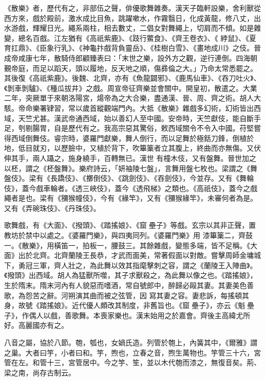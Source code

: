 \begin{pinyinscope}
 《散樂》者，歷代有之，非部伍之聲，俳優歌舞雜奏。漢天子臨軒設樂，舍利獸從西方來，戲於殿前，激水成比目魚，跳躍嗽水，作霧翳日，化成黃龍，修八丈，出水游戲，輝耀日光。繩系兩柱，相去數丈，二倡女對舞繩上，切肩而不傾。如是雜變，總名百戲。江左猶有《高祇紫鹿》、《跂行鱉食》、《齊王卷衣》、《
 綍鼠》、《夏育扛鼎》、《臣象行乳》、《神龜抃戲背負靈岳》、《桂樹白雪》、《畫地成川》之伎。晉成帝咸康七年，散騎侍郎顧臻表曰：「末世之樂，設外方之觀，逆行連倒。四海朝覲帝庭，而足以蹈天，頭以履地，反天地之順，傷彞倫之大。」乃命太常悉罷之。其後復《高祇紫鹿》。後魏、北齊，亦有《魚龍闢邪》、《鹿馬仙車》、《吞刀吐火》、《剝車剝驢》、《種瓜拔井》之戲。周宣帝征齊樂並會關中。開皇初，散遣之。大業二年，突厥單于來朝洛陽宮，煬帝為之大合樂，盡通漢、晉、周、齊之術。胡人大
 駭。帝命樂署肄習，常以歲首縱觀端門內。大抵《散樂》雜戲多幻術，幻術皆出西域，天竺尤甚。漢武帝通西域，始以善幻人至中國。安帝時，天竺獻伎，能自斷手足，刳剔腸胃，自是歷代有之。我高宗惡其驚俗，敕西域關令不令入中國。苻堅嘗得西域倒舞伎。睿宗時，婆羅門獻樂，舞人倒行，而以足舞於極銛刀鋒，倒植於地，低目就刃，以歷臉中，又植於背下，吹篳篥者立其腹上，終曲而亦無傷。又伏伸其手，兩人躡之，施身繞手，百轉無已。漢世
 有橦木伎，又有盤舞。晉世加之以柸，謂之《柸盤舞》。樂府詩云，「妍袖陵七盤」，言舞用盤七枚也。梁謂之《舞盤伎》。梁有《長蹻伎》、《擲倒伎》、《跳劍伎》、《吞劍伎》，今並存。又有《舞輪伎》，蓋今戲車輪者。《透三峽伎》，蓋今《透飛梯》之類也。《高祇伎》，蓋今之戲繩者是也。梁有《獼猴幢伎》，今有《緣竿》，又有《獼猴緣竿》，未審何者為是。又有《弄碗珠伎》、《丹珠伎》。



 歌舞戲，有《大面》、《撥頭》、《踏搖娘》、《窟壘子》等戲。玄宗以其非正聲，置教坊於禁中以處之。《婆羅門樂》，與四夷同列。《婆羅門樂》用
 漆篳篥二，齊鼓一。《散樂》，用橫笛一，拍板一，腰鼓三。其餘雜戲，變態多端，皆不足稱。《大面》出於北齊。北齊蘭陵王長恭，才武而面美，常著假面以對敵。嘗擊周師金墉城下，勇冠三軍，齊人壯之，為此舞以效其指麾擊刺之容，謂之《蘭陵王入陣曲》。《撥頭》出西域。胡人為猛獸所噬，其子求獸殺之，為此舞以像之也。《踏搖娘》，生於隋末。隋末河內有人貌惡而嗜酒，常自號郎中，醉歸必毆其妻。其妻美色善歌，為怨苦之辭。河朔演其曲而被之弦管，因
 寫其妻之容。妻悲訴，每搖頓其身，故號《踏搖娘》。近代優人頗改其制度，非舊旨也。《窟壘子》，亦云《魁壘子》，作偶人以戲，善歌舞。本喪家樂也。漢末始用之於嘉會。齊後主高緯尤所好。高麗國亦有之。



 八音之屬，協於八節。匏，瓠也，女媧氏造。列管於匏上，內簧其中，《爾雅》謂之巢。大者曰竽，小者曰和。竽，煦也，立春之音，煦生萬物也。竽管三十六，宮管在左。和管十三，宮管居中。今之竽、笙，並以木代匏而漆之，無復音矣。荊、梁之南，尚存古制云。




\end{pinyinscope}
